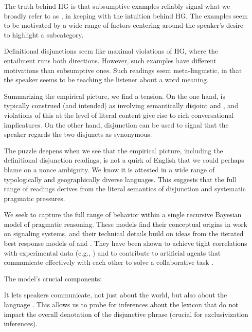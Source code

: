 \documentclass{article}
\begin{document}
\begin{examples}
\item The truth behind HG is that subsumptive examples reliably signal
  what we broadly refer to as , in keeping with
  the intuition behind HG.  The examples seem to be motivated by a
  wide range of factors centering around the speaker's desire to
  highlight a subcategory.

\item Definitional disjunctions seem like maximal violations of HG,
  where the entailment runs both directions. However, such examples
  have different motivations than subsumptive ones. Such readings seem
  meta-linguistic, in that the speaker seems to be teaching the
  listener about a word meaning.

\item Summarizing the empirical picture, we find a tension. On the one
  hand,  is typically construed (and intended) as
  involving semantically disjoint  and , and
  violations of this at the level of literal content give rise to rich
  conversational implicatures. On the other hand, disjunction can be
  used to signal that the speaker regards the two disjuncts as
  synonymous.

\item The puzzle deepens when we see that the empirical picture,
  including the definitional disjunction readings, is not a quirk of
  English that we could perhaps blame on a nonce ambiguity. We know it
  is attested in a wide range of typologically and geographically
  diverse languages. This suggests that the full range of readings
  derives from the literal semantics of disjunction and systematic
  pragmatic pressures.

\item We seek to capture the full range of behavior within a single
  recursive Bayesian model of pragmatic reasoning.  These models find
  their conceptual origins in  work on signaling
  systems, and their technical details build on ideas from the
  iterated best response models of \citet{Jaeger:2007} and
  \citet{Franke09DISS}. They have been shown to achieve tight
  correlations with experimental data (e.g.,
  \citealt{Frank:Goodman:2012}) and to contribute to artificial agents
  that communicate effectively with each other to solve a
  collaborative task \citep{Vogel-etal:2013}.

\item The model's crucial components:

  \begin{examples}
  \item It lets speakers communicate, not just about the world, but
    also about the language \citep{Smith:Goodman:Frank:2013}. This
    allows us to probe for inferences about the lexicon that do not
    impact the overall denotation of the disjunctive phrase (crucial
    for exclusivization inferences).


\end{examples}
\end{examples}
\end{document}
